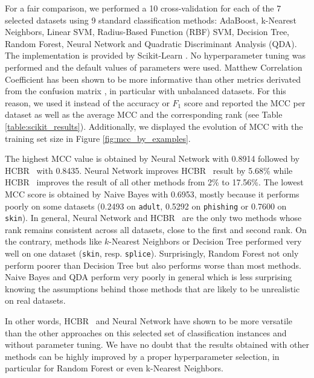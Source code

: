 \documentclass[preprint,12pt]{elsarticle}
\def\HCBR{{\sc HCBR}}
\theoremstyle{definition}
\begin{document}
For a fair comparison, we performed a 10 cross-validation for each of the 7 selected datasets using 9 standard classification methods: AdaBoost, k-Nearest Neighbors, Linear SVM, Radius-Based Function (RBF) SVM, Decision Tree, Random Forest, Neural Network and Quadratic Discriminant Analysis (QDA). The implementation is provided by Scikit-Learn \cite{scikit-learn}. No hyperparameter tuning was performed and the default values of parameters were used.
Matthew Correlation Coefficient has been shown to be more informative than other metrics derivated from the confusion matrix \cite{Chicco2017}, in particular with unbalanced datasets. For this reason, we used it instead of the accuracy or $F_1$ score and reported the MCC per dataset as well as the average MCC and the corresponding rank (see Table \ref{table:scikit_results}). Additionally, we displayed the evolution of MCC with the training set size in Figure \ref{fig:mcc_by_examples}. 

The highest MCC value is obtained by Neural Network with 0.8914 followed by \HCBR~ with 0.8435. Neural Network improves \HCBR~ result by 5.68\% while \HCBR~ improves the result of all other methods from 2\% to 17.56\%. The lowest MCC score is obtained by Naive Bayes with 0.6953, mostly because it performs poorly on some datasets (0.2493 on \texttt{adult}, 0.5292 on \texttt{phishing} or 0.7600 on \texttt{skin}). In general, Neural Network and \HCBR~ are the only two methods whose rank remains consistent across all datasets, close to the first and second rank. On the contrary, methods like $k$-Nearest Neighbors or Decision Tree performed very well on one dataset (\texttt{skin}, resp. \texttt{splice}). Surprisingly, Random Forest not only perform poorer than Decision Tree but also performs worse than most methods. 
Naive Bayes and QDA perform very poorly in general which is less surprising knowing the assumptions behind those methods that are likely to be unrealistic on real datasets.

In other words, \HCBR~ and Neural Network have shown to be more versatile than the other approaches on this selected set of classification instances and without parameter tuning. We have no doubt that the results obtained with other methods can be highly improved by a proper hyperparameter selection, in particular for Random Forest or even k-Nearest Neighbors.
\end{document}
